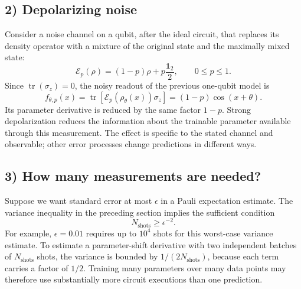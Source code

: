 \subsection*{2) Depolarizing noise}
Consider a noise channel on a qubit, after the ideal circuit, that replaces its density operator with a mixture of the original state and the maximally mixed state:
\begin{equation}
 \mathcal E_p(\rho)=(1-p)\rho+p\frac{\mathbf1_2}{2},\qquad0\le p\le1.
\end{equation}
Since $\operatorname{tr}(\sigma_z)=0$, the noisy readout of the previous one-qubit model is
\begin{equation}
 f_{\theta,p}(x)=\operatorname{tr}[\mathcal E_p(\rho_\theta(x))\sigma_z]
 =(1-p)\cos(x+\theta).
\end{equation}
Its parameter derivative is reduced by the same factor $1-p$. Strong depolarization reduces the information about the trainable parameter available through this measurement. The effect is specific to the stated channel and observable; other error processes change predictions in different ways.

\subsection*{3) How many measurements are needed?}
Suppose we want standard error at most $\epsilon$ in a Pauli expectation estimate. The variance inequality in the preceding section implies the sufficient condition
\begin{equation}
 N_{\mathrm{shots}}\ge\epsilon^{-2}.
\end{equation}
For example, $\epsilon=0.01$ requires up to $10^4$ shots for this worst-case variance estimate. To estimate a parameter-shift derivative with two independent batches of $N_{\mathrm{shots}}$ shots, the variance is bounded by $1/(2N_{\mathrm{shots}})$, because each term carries a factor of $1/2$. Training many parameters over many data points may therefore use substantially more circuit executions than one prediction.

